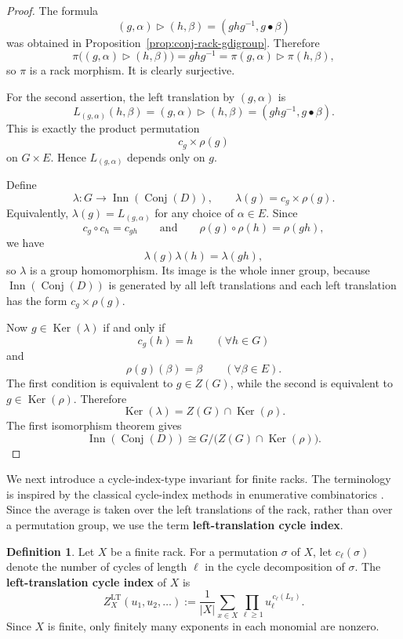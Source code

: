 \documentclass[11pt]{article}
\theoremstyle{plain}
\theoremstyle{definition}
\newtheorem{definition}[theorem]{Definition}
\theoremstyle{remark}
\DeclareMathOperator{\Conj}{Conj}
\begin{document}
	\begin{proof}
		The formula
		\[
		(g,\alpha)\triangleright(h,\beta)
		=
		(ghg^{-1},g\bullet\beta)
		\]
		was obtained in Proposition~\ref{prop:conj-rack-gdigroup}. Therefore
		\[
		\pi\bigl((g,\alpha)\triangleright(h,\beta)\bigr)
		=
		ghg^{-1}
		=
		\pi(g,\alpha)\triangleright \pi(h,\beta),
		\]
		so \(\pi\) is a rack morphism. It is clearly surjective.
		
		For the second assertion, the left translation by \((g,\alpha)\) is
		\[
		L_{(g,\alpha)}(h,\beta)
		=
		(g,\alpha)\triangleright(h,\beta)
		=
		(ghg^{-1},g\bullet\beta).
		\]
		This is exactly the product permutation
		\[
		c_g\times\rho(g)
		\]
		on \(G\times E\). Hence \(L_{(g,\alpha)}\) depends only on \(g\).
		
		Define
		\[
		\lambda:G\longrightarrow \operatorname{Inn}(\Conj(D)),
		\qquad
		\lambda(g)=c_g\times\rho(g).
		\]
		Equivalently, \(\lambda(g)=L_{(g,\alpha)}\) for any choice of
		\(\alpha\in E\). Since
		\[
		c_g\circ c_h=c_{gh}
		\qquad\text{and}\qquad
		\rho(g)\circ\rho(h)=\rho(gh),
		\]
		we have
		\[
		\lambda(g)\lambda(h)=\lambda(gh),
		\]
		so \(\lambda\) is a group homomorphism. Its image is the whole inner group,
		because \(\operatorname{Inn}(\Conj(D))\) is generated by all left
		translations and each left translation has the form \(c_g\times\rho(g)\).
		
		Now \(g\in\operatorname{Ker}(\lambda)\) if and only if
		\[
		c_g(h)=h
		\qquad
		(\forall h\in G)
		\]
		and
		\[
		\rho(g)(\beta)=\beta
		\qquad
		(\forall \beta\in E).
		\]
		The first condition is equivalent to \(g\in Z(G)\), while the second is
		equivalent to \(g\in\operatorname{Ker}(\rho)\). Therefore
		\[
		\operatorname{Ker}(\lambda)
		=
		Z(G)\cap\operatorname{Ker}(\rho).
		\]
		The first isomorphism theorem gives
		\[
		\operatorname{Inn}(\Conj(D))
		\cong
		G/\bigl(Z(G)\cap\operatorname{Ker}(\rho)\bigr).
		\]
	\end{proof}
	
	We next introduce a cycle-index-type invariant for finite racks. The terminology
	is inspired by the classical cycle-index methods in enumerative combinatorics
	\cite{Read1968,HararyPalmer}. Since the average is taken over the left
	translations of the rack, rather than over a permutation group, we use the term
	\textbf{left-translation cycle index}.
	
	\begin{definition}\label{def:left-translation-cycle-index}
		Let \(X\) be a finite rack. For a permutation \(\sigma\) of \(X\), let
		\(c_\ell(\sigma)\) denote the number of cycles of length \(\ell\) in the
		cycle decomposition of \(\sigma\). The \textbf{left-translation cycle index}
		of \(X\) is
		\[
		Z_X^{\mathrm{LT}}(u_1,u_2,\ldots)
		:=
		\frac{1}{|X|}
		\sum_{x\in X}
		\prod_{\ell\geq 1}
		u_\ell^{\,c_\ell(L_x)}.
		\]
		Since \(X\) is finite, only finitely many exponents in each monomial are
		nonzero.
	\end{definition}
	
\end{document}
